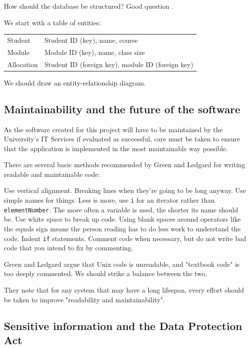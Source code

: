 \documentclass[]{scrartcl}
\begin{document}
How should the database be structured? Good question \cite{DatabaseModelsLanguagesDesign}.

We start with a table of entities:

\begin{tabular}{ l l }
  Student    & Student ID (key), name, course \\
  Module     & Module ID (key), name, class size \\
  Allocation & Student ID (foreign key), module ID (foreign key) \\
\end{tabular}

We should draw an entity-relationship diagram.

\subsection{Maintainability and the future of the software}

As the software created for this project will have to be maintained by the University's IT Services if evaluated as successful, care must be taken to ensure that the application is implemented in the most maintainable way possible.

There are several basic methods recommended by Green and Ledgard \cite{Green:2011:CGF:2063166.2063168} for writing readable and maintainable code:

Use vertical alignment. Breaking lines when they're going to be long anyway. Use simple names for things. Less is more, use \texttt{i} for an iterator rather than \texttt{elementNumber}. The more often a variable is used, the shorter its name should be. Use white space to break up code. Using blank spaces around operators like the equals sign means the person reading has to do less work to understand the code. Indent \texttt{if} statements. Comment code when necessary, but do not write bad code that you intend to fix by commenting.

Green and Ledgard argue that Unix code is unreadable, and "textbook code" is too deeply commented. We should strike a balance between the two.

They note that for any system that may have a long lifespan, every effort should be taken to improve "readability and maintainability".

\subsection{Sensitive information and the Data Protection Act}
\end{document}
